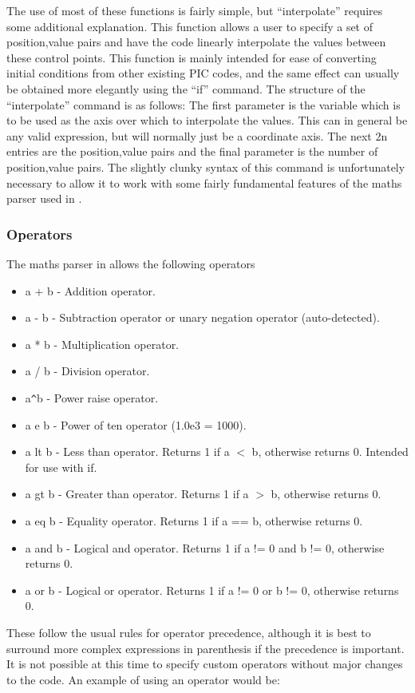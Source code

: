 The use of most of these functions is fairly simple, but
``interpolate'' requires some additional explanation. This function allows a
user to specify a set of position,value pairs and have the code linearly
interpolate the values between these control points. This function is mainly
intended for ease of converting initial conditions from other existing PIC
codes, and the same effect can usually be obtained more elegantly using the
``if'' command. The structure of the ``interpolate'' command is as follows:
The first parameter is the variable which is to be used as the axis over which
to interpolate the values. This can in general be any valid expression, but
will normally just be a coordinate axis. The next 2n entries are the
position,value pairs and the final parameter is the number of position,value
pairs. The slightly clunky syntax of this command is unfortunately necessary to
allow it to work with some fairly fundamental features of the maths parser
used in {\EPOCH}.

\subsubsection{Operators}
The maths parser in {\EPOCH} allows the following operators
\begin{itemize}
\item a + b - Addition operator.
\item a - b - Subtraction operator or unary negation operator (auto-detected).
\item a * b - Multiplication operator.
\item a / b - Division operator.
\item a\verb|^|b - Power raise operator.
\item a e b - Power of ten operator (1.0e3 = 1000).
\item a lt b - Less than operator. Returns 1 if a $<$ b, otherwise returns
  0. Intended for use with if.
\item a gt b - Greater than operator. Returns 1 if a $>$ b, otherwise returns 0.
\item a eq b - Equality operator. Returns 1 if a == b, otherwise returns 0.
\item a and b - Logical and operator. Returns 1 if a != 0 and b != 0,
  otherwise returns 0.
\item a or b - Logical or operator. Returns 1 if a != 0 or b != 0, otherwise
  returns 0.
\end{itemize}

These follow the usual rules for operator precedence, although it is best
to surround more complex expressions in parenthesis if the precedence
is important.
It is not possible at this time to specify custom operators without major
changes to the code. An example of using an operator would be:\\
\indent{}


